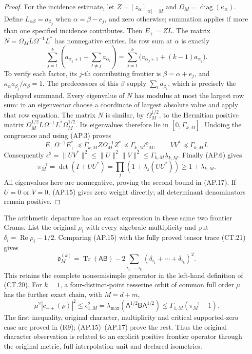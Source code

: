 \begin{proof}
For the incidence estimate, let \(Z=[z_\alpha]_{|\alpha|=M}\)
and \(\Omega_M=\operatorname{diag}(\kappa_\alpha)\).
Define \(L_{\alpha\beta}=a_{\beta_j}\) when
\(\alpha=\beta-e_j\), and zero otherwise; summation applies
if more than one specified incidence contributes.  Then \(E_+=ZL\).
The matrix \(N=\Omega_M L\Omega^{-1}L^*\) has nonnegative
entries.  Its row sum at \(\alpha\) is exactly
\[
 \sum_{j=1}^k\left(a_{\alpha_j+1}
                         +\sum_{l\ne j}a_{\alpha_l}\right)
   =\sum_{j=1}^k\bigl(a_{\alpha_j+1}+(k-1)a_{\alpha_j}\bigr).
 \tag{AP.19}
\]
To verify each factor, its \(j\)-th contributing frontier is
\(\beta=\alpha+e_j\), and
\(\kappa_\alpha a_{\beta_j}/\kappa_\beta=1\).
The predecessors of this \(\beta\) supply
\(\sum_l a_{\beta_l}\), which is precisely the displayed
summand.  Every eigenvalue of \(N\) has modulus at most the
largest row sum: in an eigenvector choose a coordinate of largest
absolute value and apply that row equation.  The matrix \(N\)
is similar, by \(\Omega_M^{1/2}\), to the Hermitian positive
matrix \(\Omega_M^{1/2}L\Omega^{-1}L^*\Omega_M^{1/2}\).
Its eigenvalues therefore lie in \([0,\Gamma_{k,M}]\).
Undoing the congruence and using (AP.3) proves
\[
 E_+\Omega^{-1}E_+^*
   \preceq\Gamma_{k,M}Z\Omega_M^{-1}Z^*
   \preceq\Gamma_{k,M}\mathcal C_M,
 \qquad VV^*\preceq\Gamma_{k,M}I.
 \tag{AP.20}
\]
Consequently \(\epsilon^2=\|UV^*\|^2
\le\|U\|^2\|V\|^2\le\Gamma_{k,M}\lambda_{k,M}\).
Finally (AP.6) gives
\[
 \pi_M^{-1}=\det(I+UU^*)
    =\prod_j(1+\lambda_j(UU^*))
    \ge1+\lambda_{k,M}.
 \tag{AP.21}
\]
All eigenvalues here are nonnegative, proving the second bound in
(AP.17).  If \(U=0\) or \(V=0\), (AP.15) gives zero
weight directly; all determinant denominators remain positive.
\end{proof}

The arithmetic departure has an exact expression in these same
two frontier Grams.  List the original \(\rho_i\) with every
algebraic multiplicity and put
\(\delta_i=\operatorname{Re}\rho_i-1/2\).  Comparing
(AP.15) with the fully proved tensor trace (CT.21) gives
\[
 \mathfrak d_M^{(k)}
    =\operatorname{Tr}(\mathsf A\mathsf B)
           -2\sum_{i_1,\ldots,i_k}
                         (\delta_{i_1}+\cdots+\delta_{i_k})^2.
 \tag{AP.22}
\]
This retains the complete nonsemisimple generator in the left-hand
definition of (CT.20).  For \(k=1\), a four-distinct-point
tesserine orbit of common full order \(\mu\) has the further
exact chain, with \(M=d+m\),
\[
 \mu^2|c_{-+}(\rho)|^2
 \le\epsilon_{1,M}^2
 =\lambda_{\max}(\mathsf A^{1/2}\mathsf B\mathsf A^{1/2})
 \le\Gamma_{1,M}(\pi_M^{-1}-1).
 \tag{AP.23}
\]
The first inequality, original character, multiplicity and critical
supported-zero case are proved in (R9); (AP.15)--(AP.17) prove
the rest.  Thus the original character observation is related to
an explicit positive frontier operator through the original
metric, full interpolation unit and declared isometries.

